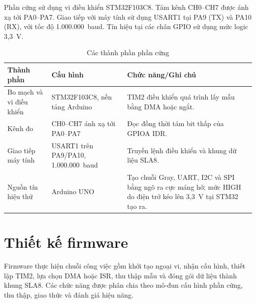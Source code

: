 Phần cứng sử dụng vi điều khiển STM32F103C8. Tám kênh CH0--CH7 được ánh xạ tới PA0--PA7. Giao tiếp với máy tính sử dụng USART1 tại PA9 (TX) và PA10 (RX), với tốc độ 1.000.000~baud. Tín hiệu tại các chân GPIO sử dụng mức logic 3,3~V.

\begin{longtable}[]{@{}|
  >{\raggedright\arraybackslash}p{}
  |>{\raggedright\arraybackslash}p{}
  |>{\raggedright\arraybackslash}p{}|@{}}
\caption{Các thành phần phần cứng}\tabularnewline
\hline
\textbf{Thành phần} & \textbf{Cấu hình} & \textbf{Chức năng/Ghi chú} \\ \hline

Bo mạch và vi điều khiển & STM32F103C8, nền tảng Arduino & TIM2 điều khiển quá trình lấy mẫu bằng DMA hoặc ngắt. \\ \hline
Kênh đo & CH0--CH7 ánh xạ tới PA0--PA7 & Đọc đồng thời tám bit thấp của GPIOA IDR. \\ \hline
Giao tiếp máy tính & USART1 trên PA9/PA10, 1.000.000~baud & Truyền lệnh điều khiển và khung dữ liệu SLA8. \\ \hline
Nguồn tín hiệu thử & Arduino UNO & Tạo chuỗi Gray, UART, I2C và SPI bằng ngõ ra cực máng hở; mức HIGH do điện trở kéo lên 3,3~V tại STM32 tạo ra. \\ \hline

\end{longtable}

\section{Thiết kế firmware}\label{sec:firmware-design}

Firmware thực hiện chuỗi công việc gồm khởi tạo ngoại vi, nhận cấu hình, thiết lập TIM2, lựa chọn DMA hoặc ISR, thu thập mẫu và đóng gói dữ liệu thành khung SLA8. Các chức năng được phân chia theo mô-đun cấu hình phần cứng, thu thập, giao thức và đánh giá hiệu năng.

